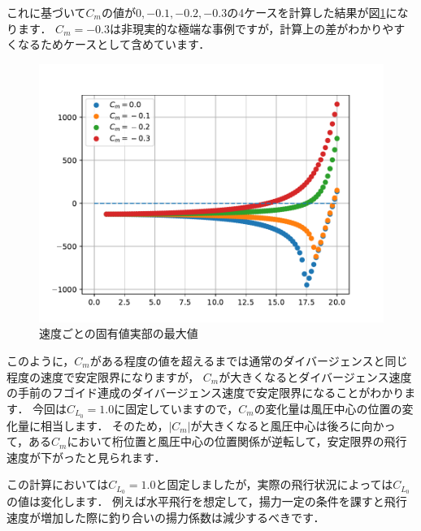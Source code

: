 \documentclass{jarticle}
\begin{document}
これに基づいて$C_m$の値が$0,-0.1,-0.2,-0.3$の4ケースを計算した結果が図\ref{eigen2}になります．
$C_m=-0.3$は非現実的な極端な事例ですが，計算上の差がわかりやすくなるためケースとして含めています．
\begin{figure}[H]
    \centering
    \includegraphics[width=0.7\linewidth]{image/eigenplot.pdf}
    \caption{速度ごとの固有値実部の最大値}
    \label{eigen2}
\end{figure}
このように，$C_m$がある程度の値を超えるまでは通常のダイバージェンスと同じ程度の速度で安定限界になりますが，
$C_m$が大きくなるとダイバージェンス速度の手前のフゴイド連成のダイバージェンス速度で安定限界になることがわかります．
今回は$C_{L_0}=1.0$に固定していますので，$C_m$の変化量は風圧中心の位置の変化量に相当します．
そのため，$|C_m|$が大きくなると風圧中心は後ろに向かって，ある$C_m$において桁位置と風圧中心の位置関係が逆転して，安定限界の飛行速度が下がったと見られます．

この計算においては$C_{L_0}=1.0$と固定しましたが，実際の飛行状況によっては$C_{L_0}$の値は変化します．
例えば水平飛行を想定して，揚力一定の条件を課すと飛行速度が増加した際に釣り合いの揚力係数は減少するべきです．
\end{document}
